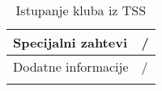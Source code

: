 \documentclass{article}
\begin{document}
\begin{longtable}{| p{} | p{} |}
\hline
    Specijalni zahtevi & /\\
\hline
    Dodatne informacije & /\\
\hline
  
\caption{Istupanje kluba iz TSS} 

\end{longtable}
\end{document}
